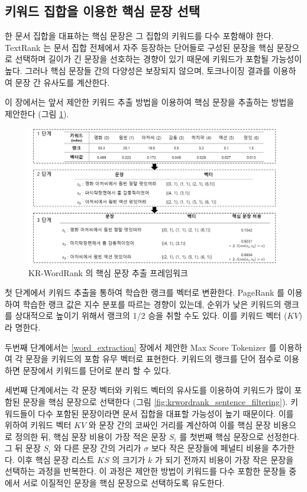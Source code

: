 \documentclass[oneside, ko,phd]{snuthesis_utf8_kor}
\begin{document}
\subsection{키워드 집합을 이용한 핵심 문장 선택}

한 문서 집합을 대표하는 핵심 문장은 그 집합의 키워드를 다수 포함해야 한다.
TextRank 는 문서 집합 전체에서 자주 등장하는 단어들로 구성된 문장을 핵심 문장으로 선택하며 길이가 긴 문장을 선호하는 경향이 있기 때문에 키워드가 포함될 가능성이 높다.
그러나 핵심 문장들 간의 다양성은 보장되지 않으며, 토크나이징 결과를 이용하여 문장 간 유사도를 계산한다.

이 장에서는 앞서 제안한 키워드 추출 방법을 이용하여 핵심 문장을 추출하는 방법을 제안한다 (그림 \ref{fig:krwordrank_framework_sentence}).

\begin{figure}[H]
\centering
\includegraphics[keepaspectratio=true, width=0.9\linewidth]{fig/krwordrank_framework_sentence.png}
\caption{KR-WordRank 의 핵심 문장 추출 프레임워크}
\label{fig:krwordrank_framework_sentence}
\end{figure}

첫 단계에서 키워드 추출을 통하여 학습한 랭크를 벡터로 변환한다.
PageRank 를 이용하여 학습한 랭크 값은 지수 분포를 따르는 경향이 있는데, 순위가 낮은 키워드의 랭크를 상대적으로 높이기 위해서 랭크의 1/2 승을 취할 수도 있다.
이를 키워드 벡터 ($KV$) 라 명한다.

두번째 단계에서는 \ref{word_extraction} 장에서 제안한 Max Score Tokenizer 를 이용하여 각 문장을 키워드의 포함 유무 벡터로 표현한다.
키워드의 랭크를 단어 점수로 이용하면 문장에서 키워드를 단어로 분리 할 수 있다.

세번째 단계에서는 각 문장 벡터와 키워드 벡터의 유사도를 이용하여 키워드가 많이 포함된 문장을 핵심 문장으로 선택한다 (그림 \ref{fig:krwordrank_sentence_filtering}).
키워드들이 다수 포함된 문장이라면 문서 집합을 대표할 가능성이 높기 때문이다.
이를 위하여 키워드 벡터 $KV$ 와 문장 간의 코싸인 거리를 계산하여 이를 핵심 문장 비용으로 정의한 뒤, 핵심 문장 비용이 가장 적은 문장 $S_i$ 를 첫번째 핵심 문장으로 선정한다.
그 뒤 문장 $S_i$ 와 다른 문장 간의 거리가 $\sigma$ 보다 작은 문장들에 페널티 비용을 추가한다.
이후 핵심 문장 리스트 $KS$ 의 크기가 $k$ 가 되기 전까지 비용이 가장 작은 문장을 선택하는 과정을 반복한다.
이 과정은 제안한 방법이 키워드를 다수 포함한 문장들 중에서 서로 이질적인 문장을 핵심 문장으로 선택하도록 유도한다.
\end{document}
